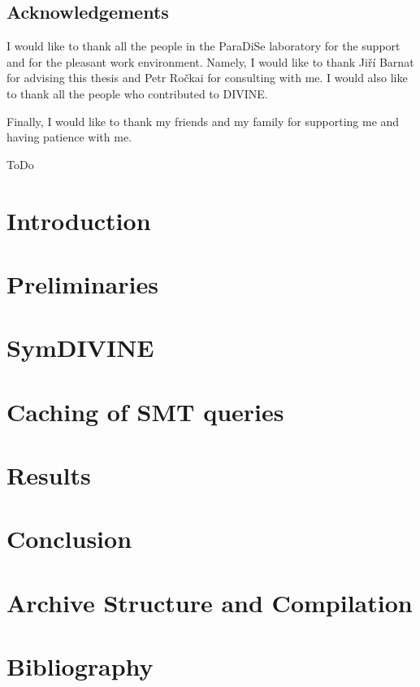 \documentclass[11pt,twoside,a4paper]{book}
\newcommand{\symdivine}{\mbox{\textsf{SymDIVINE}}\xspace}
\newcommand{\divine}{\mbox{\textsf{DIVINE}}\xspace}
\newcommand{\smt}{\mbox{\textsf{SMT}}\xspace}
\newcommand{\paradise}{ParaDiSe\xspace}
\begin{document}
\cleardoublepage

\section*{Acknowledgements} I would like to thank all the people in the
\paradise laboratory for the support and for the pleasant work environment.
Namely, I would like to thank Jiří Barnat for advising this thesis and Petr
Ročkai for consulting with me. I would also like to thank all the people who
contributed to \divine.

Finally, I would like to thank my friends and my family for supporting me and
having patience with me.

ToDo

\cleardoublepage
\thispagestyle{empty}

\pagestyle{headings}
\tableofcontents %
\mainmatter

\chapter{Introduction}\label{chap:introduction}


\chapter{Preliminaries}\label{chap:preliminaries}


\chapter{\symdivine} \label{chap:symdivine}


\chapter{Caching of \smt queries} \label{chap:caching}


\chapter{Results} \label{chap:results}


\chapter{Conclusion} \label{chap:conclusion}


\appendix
\chapter{Archive Structure and Compilation} \label{chap:appendix}


\chapter*{Bibliography}
\markboth{}{} %
\printbibliography[heading=none]
\end{document}
